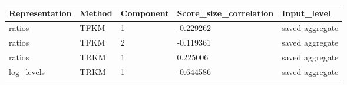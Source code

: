 \begin{tabular}{lllll}
\toprule
Representation & Method & Component & Score\_size\_correlation & Input\_level \\
\midrule
ratios & TFKM & 1 & -0.229262 & saved aggregate \\
ratios & TFKM & 2 & -0.119361 & saved aggregate \\
ratios & TRKM & 1 & 0.225006 & saved aggregate \\
log\_levels & TRKM & 1 & -0.644586 & saved aggregate \\
\bottomrule
\end{tabular}
